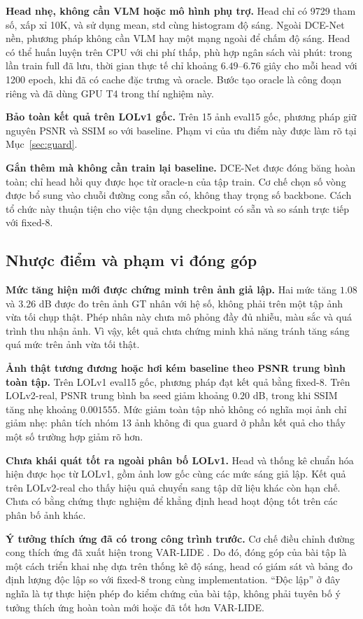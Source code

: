 \textbf{Head nhẹ, không cần VLM hoặc mô hình phụ trợ.} Head chỉ có 9729 tham số, xấp xỉ 10K, và sử dụng mean, std cùng histogram độ sáng. Ngoài DCE-Net nền, phương pháp không cần VLM hay một mạng ngoài để chấm độ sáng. Head có thể huấn luyện trên CPU với chi phí thấp, phù hợp ngân sách vài phút: trong lần train full đã lưu, thời gian thực tế chỉ khoảng $6.49$--$6.76$ giây cho mỗi head với 1200 epoch, khi đã có cache đặc trưng và oracle. Bước tạo oracle là công đoạn riêng và đã dùng GPU T4 trong thí nghiệm này.

\textbf{Bảo toàn kết quả trên LOLv1 gốc.} Trên 15 ảnh eval15 gốc, phương pháp giữ nguyên PSNR và SSIM so với baseline. Phạm vi của ưu điểm này được làm rõ tại Mục~\ref{sec:guard}.

\textbf{Gắn thêm mà không cần train lại baseline.} DCE-Net được đóng băng hoàn toàn; chỉ head hồi quy được học từ oracle-n của tập train. Cơ chế chọn số vòng được bổ sung vào chuỗi đường cong sẵn có, không thay trọng số backbone. Cách tổ chức này thuận tiện cho việc tận dụng checkpoint có sẵn và so sánh trực tiếp với fixed-8.

\subsection{Nhược điểm và phạm vi đóng góp}
\textbf{Mức tăng hiện mới được chứng minh trên ảnh giả lập.} Hai mức tăng $1.08$ và $3.26$ dB được đo trên ảnh GT nhân với hệ số, không phải trên một tập ảnh vừa tối chụp thật. Phép nhân này chưa mô phỏng đầy đủ nhiễu, màu sắc và quá trình thu nhận ảnh. Vì vậy, kết quả chưa chứng minh khả năng tránh tăng sáng quá mức trên ảnh vừa tối thật.

\textbf{Ảnh thật tương đương hoặc hơi kém baseline theo PSNR trung bình toàn tập.} Trên LOLv1 eval15 gốc, phương pháp đạt kết quả bằng fixed-8. Trên LOLv2-real, PSNR trung bình ba seed giảm khoảng $0.20$ dB, trong khi SSIM tăng nhẹ khoảng $0.001555$. Mức giảm toàn tập nhỏ không có nghĩa mọi ảnh chỉ giảm nhẹ: phân tích nhóm 13 ảnh không đi qua guard ở phần kết quả cho thấy một số trường hợp giảm rõ hơn.

\textbf{Chưa khái quát tốt ra ngoài phân bố LOLv1.} Head và thống kê chuẩn hóa hiện được học từ LOLv1, gồm ảnh low gốc cùng các mức sáng giả lập. Kết quả trên LOLv2-real cho thấy hiệu quả chuyển sang tập dữ liệu khác còn hạn chế. Chưa có bằng chứng thực nghiệm để khẳng định head hoạt động tốt trên các phân bố ảnh khác.

\textbf{Ý tưởng thích ứng đã có trong công trình trước.} Cơ chế điều chỉnh đường cong thích ứng đã xuất hiện trong VAR-LIDE \cite{varlide}. Do đó, đóng góp của bài tập là một cách triển khai nhẹ dựa trên thống kê độ sáng, head có giám sát và bảng đo định lượng độc lập so với fixed-8 trong cùng implementation. ``Độc lập'' ở đây nghĩa là tự thực hiện phép đo kiểm chứng của bài tập, không phải tuyên bố ý tưởng thích ứng hoàn toàn mới hoặc đã tốt hơn VAR-LIDE.

